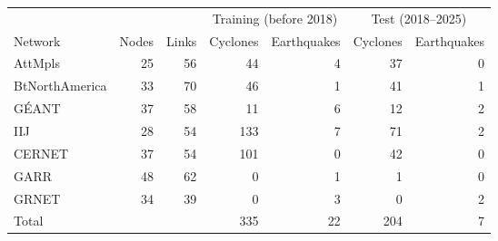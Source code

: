 \begin{tabular}{lrrrrrr}
\toprule
 & & & \multicolumn{2}{c}{Training (before 2018)} & \multicolumn{2}{c}{Test (2018--2025)} \\
\cmidrule(lr){4-5}\cmidrule(lr){6-7}
Network & Nodes & Links & Cyclones & Earthquakes & Cyclones & Earthquakes \\
\midrule
AttMpls & 25 & 56 & 44 & 4 & 37 & 0 \\
BtNorthAmerica & 33 & 70 & 46 & 1 & 41 & 1 \\
G\'EANT & 37 & 58 & 11 & 6 & 12 & 2 \\
IIJ & 28 & 54 & 133 & 7 & 71 & 2 \\
CERNET & 37 & 54 & 101 & 0 & 42 & 0 \\
GARR & 48 & 62 & 0 & 1 & 1 & 0 \\
GRNET & 34 & 39 & 0 & 3 & 0 & 2 \\
\midrule
Total & & & 335 & 22 & 204 & 7 \\
\bottomrule
\end{tabular}
